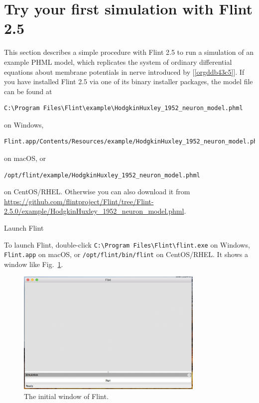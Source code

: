 \documentclass[a4paper,10pt]{report}
\begin{document}
\section{Try your first simulation with Flint 2.5}
\label{sec:orgb323333}
This section describes a simple procedure with Flint 2.5 to run a simulation of an
example PHML model, which replicates the system of ordinary differential
equations about membrane potentials in nerve introduced by
[\ref{orgddb43c5}].
If you have installed Flint 2.5 via one of its binary installer packages, the
model file can be found at
\begin{verbatim}
C:\Program Files\Flint\example\HodgkinHuxley_1952_neuron_model.phml
\end{verbatim}
on Windows,
\begin{verbatim}
Flint.app/Contents/Resources/example/HodgkinHuxley_1952_neuron_model.phml
\end{verbatim}
on macOS, or
\begin{verbatim}
/opt/flint/example/HodgkinHuxley_1952_neuron_model.phml
\end{verbatim}
on CentOS/RHEL.
Otherwise you can also download it from
\url{https://github.com/flintproject/Flint/tree/Flint-2.5.0/example/HodgkinHuxley\_1952\_neuron\_model.phml}.

\begin{description}
\item[{Launch Flint}] 
\end{description}
To launch Flint, double-click
\texttt{C:\textbackslash{}Program Files\textbackslash{}Flint\textbackslash{}flint.exe} on Windows,
\texttt{Flint.app} on macOS, or \texttt{/opt/flint/bin/flint} on CentOS/RHEL.
It shows a window like Fig.~\ref{fig:org78718b0}.
\begin{figure}[htbp]
\centering
\includegraphics[width=0.8\textwidth]{image/initial.png}
\caption{\label{fig:org78718b0}The initial window of Flint.}
\end{figure}
\end{document}
